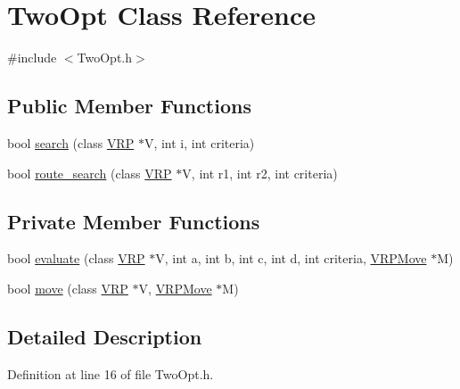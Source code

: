 \hypertarget{class_two_opt}{
\section{TwoOpt Class Reference}
\label{class_two_opt}
}


{\ttfamily \#include $<$TwoOpt.h$>$}

\subsection*{Public Member Functions}
\begin{DoxyCompactItemize}
\item 
bool \hyperlink{class_two_opt_a25c0dab70146ebfb47209d41ee142c54}{search} (class \hyperlink{class_v_r_p}{VRP} $\ast$V, int i, int criteria)
\item 
bool \hyperlink{class_two_opt_ad7cda00cc9cd14a6edbd55d7108ca973}{route\_\-search} (class \hyperlink{class_v_r_p}{VRP} $\ast$V, int r1, int r2, int criteria)
\end{DoxyCompactItemize}
\subsection*{Private Member Functions}
\begin{DoxyCompactItemize}
\item 
bool \hyperlink{class_two_opt_afea58186ca3dbcdf0cca07a006a355a1}{evaluate} (class \hyperlink{class_v_r_p}{VRP} $\ast$V, int a, int b, int c, int d, int criteria, \hyperlink{class_v_r_p_move}{VRPMove} $\ast$M)
\item 
bool \hyperlink{class_two_opt_a881837b89e07a3d2c12890ec0c4f7297}{move} (class \hyperlink{class_v_r_p}{VRP} $\ast$V, \hyperlink{class_v_r_p_move}{VRPMove} $\ast$M)
\end{DoxyCompactItemize}


\subsection{Detailed Description}


Definition at line 16 of file TwoOpt.h.




